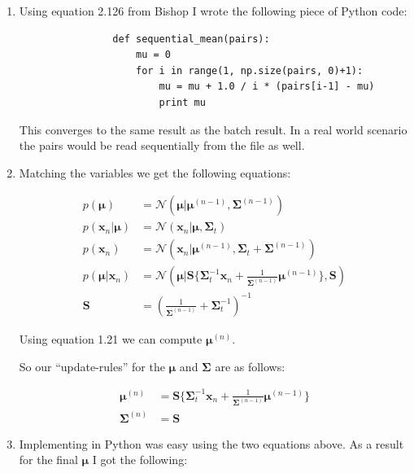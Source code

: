 \documentclass[paper=a4, fontsize=10pt]{scrartcl} %
\numberwithin{equation}{section} %
\numberwithin{figure}{section} %
\numberwithin{table}{section} %
\begin{document}
\begin{enumerate}
	\item Using equation 2.126 from Bishop I wrote the following piece of Python code:

			\begin{verbatim}
				def sequential_mean(pairs):
				    mu = 0
				    for i in range(1, np.size(pairs, 0)+1):
				        mu = mu + 1.0 / i * (pairs[i-1] - mu)
				        print mu
			\end{verbatim}

			This converges to the same result as the batch result. In a real world scenario the pairs would be read sequentially from the file as well.
	\item Matching the variables we get the following equations:

			\begin{align}
				p(\boldsymbol\mu) &= \mathcal{N} (\boldsymbol\mu \vert \boldsymbol\mu^{(n-1)}, \boldsymbol\Sigma^{(n-1)})\\
				p(\boldsymbol x_n \vert \boldsymbol\mu) &= \mathcal{N} (\boldsymbol x_n \vert \boldsymbol\mu, \boldsymbol\Sigma_t)\\
				p(\boldsymbol x_n) &= \mathcal{N} (\boldsymbol x_n \vert \boldsymbol\mu^{(n-1)}, \boldsymbol\Sigma_t + \boldsymbol\Sigma^{(n-1)})\\
				p(\boldsymbol\mu \vert \boldsymbol x_n) &= \mathcal{N} (\boldsymbol\mu \vert \boldsymbol S \{ \boldsymbol\Sigma_t^{-1} \boldsymbol x_n + \frac{1}{\boldsymbol\Sigma^{(n-1)}} \boldsymbol\mu^{(n-1)} \}, \boldsymbol S)\\
				\boldsymbol S &= (\frac{1}{\boldsymbol\Sigma^{(n-1)}} + \boldsymbol\Sigma_t^{-1})^{-1}
			\end{align}

			Using equation 1.21 we can compute $\boldsymbol \mu^{(n)}$.

			So our ``update-rules'' for the $\boldsymbol\mu$ and $\boldsymbol\Sigma$ are as follows:

			\begin{align}
				\boldsymbol\mu^{(n)} &= \boldsymbol S \{ \boldsymbol\Sigma_t^{-1} \boldsymbol x_n + \frac{1}{\boldsymbol\Sigma^{(n-1)}} \boldsymbol\mu^{(n-1)} \}\\
				\boldsymbol\Sigma^{(n)} &= \boldsymbol S
			\end{align}
	\item Implementing in Python was easy using the two equations above. As a result for the final $\boldsymbol\mu$ I got the following:


\end{enumerate}
\end{document}
